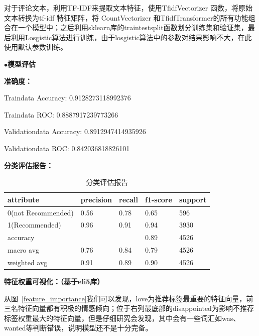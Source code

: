 \documentclass[
  journal=medium,
  manuscript=article-type,
  year=2023,
  volume=37,
]{cup-journal}
\begin{document}
​对于评论文本，利用TF-IDF来提取文本特征，使用TfidfVectorizer 函数，将原始文本转换为tf-idf 特征矩阵，将 CountVectorizer 和TfidfTransformer的所有功能组合在一个模型中；之后利用sklearn库的traintestsplit函数划分训练集和验证集，最后利用Losgistic算法进行训练，由于losgistic算法中的参数对结果影响不大，在此使用默认参数训练。

\noindent$\bullet$\textbf{模型评估}

\noindent \textbf{准确度：}

Traindata Accuracy: 0.9128273118992376

Traindata ROC: 0.8887917239773266

Validationdata Accuracy: 0.8912947414935926

Validationdata ROC: 0.842036818826101

\noindent \textbf{分类评估报告：}

\begin{table}[hbt!]
    \begin{threeparttable}
    \caption{分类评估报告}
    \label{table_classification}
    \begin{tabular}{lllll}
    \toprule
    \headrow attribute & precision & recall & f1-score & support\\
    \midrule
    0(not Recommended) & 0.56 & 0.78 & 0.65 & 596 \\ 
    \midrule
    1(Recommended) & 0.96 & 0.91 & 0.94 & 3930 \\ 
    \midrule
    accuracy & & & 0.89  & 4526 \\ 
    \midrule
    macro avg & 0.76 & 0.84 & 0.79 & 4526 \\ 
    \midrule
    weighted avg & 0.91 & 0.89 & 0.90 & 4526\\ 
    \bottomrule 
    \end{tabular}
    \end{threeparttable}
\end{table}

\noindent \textbf{特征权重可视化：（基于eli5库）}

从图~\ref{feature_importance}我们可以发现，love为推荐标签最重要的特征向量，前三名特征向量都有积极的情感倾向；位于右列最底部的disappointed为影响不推荐标签权重最大的特征向量，但是仔细研究会发现，其中会有一些词汇如was、wanted等判断错误，说明模型还不是十分完备。
\end{document}
